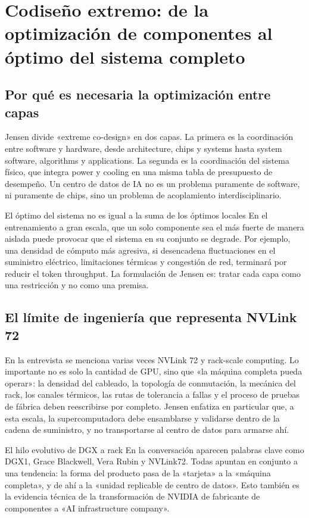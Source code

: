 \section{Codiseño extremo: de la optimización de componentes al óptimo del sistema completo}

\subsection{Por qué es necesaria la optimización entre capas}

Jensen divide «extreme co-design» en dos capas. La primera es la coordinación entre software y hardware, desde architecture, chips y systems hasta system software, algorithms y applications. La segunda es la coordinación del sistema físico, que integra power y cooling en una misma tabla de presupuesto de desempeño. Un centro de datos de IA no es un problema puramente de software, ni puramente de chips, sino un problema de acoplamiento interdisciplinario.

\begin{importantbox}{El óptimo del sistema no es igual a la suma de los óptimos locales}
En el entrenamiento a gran escala, que un solo componente sea el más fuerte de manera aislada puede provocar que el sistema en su conjunto se degrade. Por ejemplo, una densidad de cómputo más agresiva, si desencadena fluctuaciones en el suministro eléctrico, limitaciones térmicas y congestión de red, terminará por reducir el token throughput. La formulación de Jensen es: tratar cada capa como una restricción y no como una premisa.
\end{importantbox}

\subsection{El límite de ingeniería que representa NVLink 72}

En la entrevista se menciona varias veces NVLink 72 y rack-scale computing. Lo importante no es solo la cantidad de GPU, sino que «la máquina completa pueda operar»: la densidad del cableado, la topología de conmutación, la mecánica del rack, los canales térmicos, las rutas de tolerancia a fallas y el proceso de pruebas de fábrica deben reescribirse por completo. Jensen enfatiza en particular que, a esta escala, la supercomputadora debe ensamblarse y validarse dentro de la cadena de suministro, y no transportarse al centro de datos para armarse ahí.

\begin{knowledgebox}{El hilo evolutivo de DGX a rack}
En la conversación aparecen palabras clave como DGX1, Grace Blackwell, Vera Rubin y NVLink72. Todas apuntan en conjunto a una tendencia: la forma del producto pasa de la «tarjeta» a la «máquina completa», y de ahí a la «unidad replicable de centro de datos». Esto también es la evidencia técnica de la transformación de NVIDIA de fabricante de componentes a «AI infrastructure company».
\end{knowledgebox}

